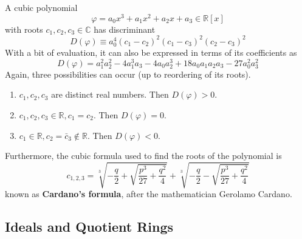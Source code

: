       \begin{lemma}
        A cubic polynomial 
        \begin{equation}
          \varphi = a_0 x^3 + a_1 x^2 + a_2 x + a_3 \in \mathbb{R}[x]
        \end{equation}
        with roots $c_1, c_2, c_3 \in \mathbb{C}$ has discriminant
        \begin{equation}
          D(\varphi) \equiv a_0^4 (c_1 - c_2)^2 (c_1 - c_3)^2 (c_2 - c_3)^2
        \end{equation}
        With a bit of evaluation, it can also be expressed in terms of its coefficients as
        \begin{equation}
          D(\varphi) = a_1^2 a_2^2 - 4a_1^3 a_3 - 4a_0 a_2^3 + 18 a_0 a_1 a_2 a_3 - 27 a_0^2 a_3^2
        \end{equation}
        Again, three possibilities can occur (up to reordering of its roots). 
        \begin{enumerate}
            \item $c_1, c_2, c_3$ are distinct real numbers. Then $D(\varphi) > 0$. 
            \item $c_1, c_2, c_3 \in \mathbb{R}, c_1 = c_2$. Then $D(\varphi) = 0$. 
            \item $c_1 \in \mathbb{R}, c_2 = \bar{c}_3 \not\in \mathbb{R}$. Then $D(\varphi) < 0$. 
        \end{enumerate}
        Furthermore, the cubic formula used to find the roots of the polynomial is 
        \begin{equation}
          c_{1, 2, 3} = \sqrt[3]{-\frac{q}{2} + \sqrt{\frac{p^3}{27} + \frac{q^2}{4}}} + \sqrt[3]{-\frac{q}{2} - \sqrt{\frac{p^3}{27} + \frac{q^2}{4}}}
        \end{equation}
        known as \textbf{Cardano's formula}, after the mathematician Gerolamo Cardano. 
      \end{lemma}

  \subsection{Ideals and Quotient Rings}

